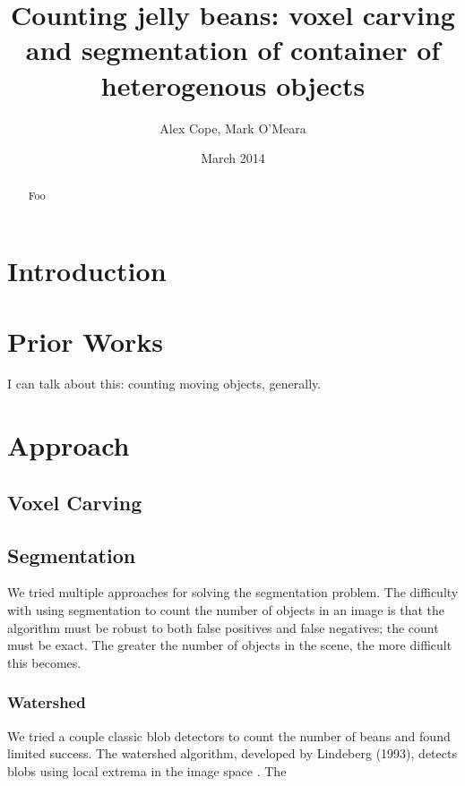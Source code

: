 \documentclass[12pt]{article}
\begin{document}
\title{Counting jelly beans: voxel carving and segmentation of container of heterogenous objects}
\author{Alex Cope, Mark O'Meara}
\date{March 2014}
\maketitle

\begin{abstract}

Foo

\end{abstract}

\section{Introduction}

\section{Prior Works}

I can talk about this: counting moving objects, generally.

\section{Approach}

\subsection{Voxel Carving}

\subsection{Segmentation}

We tried multiple approaches for solving the segmentation problem. The difficulty with using segmentation to count the number of objects in an image is that the algorithm must be robust to both false positives and false negatives; the count must be exact. The greater the number of objects in the scene, the more difficult this becomes. 

\subsubsection{Watershed}

We tried a couple classic blob detectors to count the number of beans and found limited success. The watershed algorithm, developed by Lindeberg (1993), detects blobs using local extrema in the image space \cite{Wshed}. The
\end{document}
